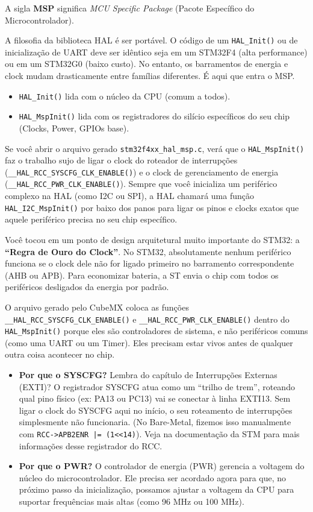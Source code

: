 \documentclass[12pt,a4paper]{article}
\begin{document}
A sigla \textbf{MSP} significa \textit{MCU Specific Package} (Pacote Específico do Microcontrolador).

A filosofia da biblioteca HAL é ser portável. O código de um \texttt{HAL\_Init()} ou de inicialização de UART deve ser idêntico seja em um STM32F4 (alta performance) ou em um STM32G0 (baixo custo). No entanto, os barramentos de energia e clock mudam drasticamente entre famílias diferentes. É aqui que entra o MSP.
\begin{itemize}
    \item \texttt{HAL\_Init()} lida com o núcleo da CPU (comum a todos).
    \item \texttt{HAL\_MspInit()} lida com os registradores do silício específicos do seu chip (Clocks, Power, GPIOs base).
\end{itemize}

Se você abrir o arquivo gerado \texttt{stm32f4xx\_hal\_msp.c}, verá que o \texttt{HAL\_MspInit()} faz o trabalho sujo de ligar o clock do roteador de interrupções (\texttt{\_\_HAL\_RCC\_SYSCFG\_CLK\_ENABLE()}) e o clock de gerenciamento de energia (\texttt{\_\_HAL\_RCC\_PWR\_CLK\_ENABLE()}). Sempre que você inicializa um periférico complexo na HAL (como I2C ou SPI), a HAL chamará uma função \texttt{HAL\_I2C\_MspInit()} por baixo dos panos para ligar os pinos e clocks exatos que aquele periférico precisa no seu chip específico.

Você tocou em um ponto de design arquitetural muito importante do STM32: a \textbf{``Regra de Ouro do Clock''}. No STM32, absolutamente nenhum periférico funciona se o clock dele não for ligado primeiro no barramento correspondente (AHB ou APB). Para economizar bateria, a ST envia o chip com todos os periféricos desligados da energia por padrão.

O arquivo gerado pelo CubeMX coloca as funções \texttt{\_\_HAL\_RCC\_SYSCFG\_CLK\_ENABLE()} e \texttt{\_\_HAL\_RCC\_PWR\_CLK\_ENABLE()} dentro do \texttt{HAL\_MspInit()} porque eles são controladores de sistema, e não periféricos comuns (como uma UART ou um Timer). Eles precisam estar vivos antes de qualquer outra coisa acontecer no chip.

\begin{itemize}
    \item \textbf{Por que o SYSCFG?} Lembra do capítulo de Interrupções Externas (EXTI)? O registrador SYSCFG atua como um ``trilho de trem'', roteando qual pino físico (ex: PA13 ou PC13) vai se conectar à linha EXTI13. Sem ligar o clock do SYSCFG aqui no início, o seu roteamento de interrupções simplesmente não funcionaria. (No Bare-Metal, fizemos isso manualmente com \texttt{RCC->APB2ENR |= (1<<14)}). Veja na documentação da STM para mais informações desse registrador do RCC.
    \item \textbf{Por que o PWR?} O controlador de energia (PWR) gerencia a voltagem do núcleo do microcontrolador. Ele precisa ser acordado agora para que, no próximo passo da inicialização, possamos ajustar a voltagem da CPU para suportar frequências mais altas (como 96 MHz ou 100 MHz).
\end{itemize}
\end{document}
